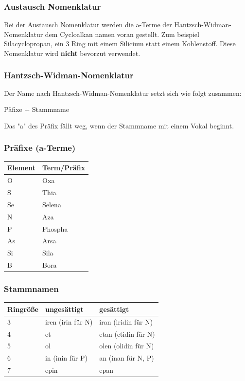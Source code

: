 \documentclass{article}
\begin{document}
\subsubsection{Austausch Nomenklatur}
Bei der Austausch Nomenklatur werden die a-Terme der Hantzsch-Widman-Nomenklatur dem Cycloalkan namen voran gestellt.
Zum beispiel Silacyclopropan, ein 3 Ring mit einem Silicium statt einem Kohlenstoff.
Diese Nomenklatur wird \textbf{nicht} bevorzut verwendet.

\subsubsection{Hantzsch-Widman-Nomenklatur}
Der Name nach Hantzsch-Widman-Nomenklatur setzt sich wie folgt zusammen:
\begin{center}
	Päfixe + Stammname
\end{center}
Das "a" des Präfix fällt weg, wenn der Stammname mit einem Vokal beginnt.
\subsubsection*{Präfixe (a-Terme)}
\begin{table}[H]
	\centering
	\begin{tabular}{|l|l|}
		\hline 
		\textbf{Element} & \textbf{Term/Präfix}\\
		\hline
		\hline
		O & Oxa\\
		S & Thia\\
		Se & Selena\\
		N & Aza\\
		P & Phospha\\
		As & Arsa \\
		Si & Sila\\
		B & Bora\\
		\hline
	\end{tabular}
\end{table}
\subsubsection*{Stammnamen}
\begin{table}[H]
	\centering 
	\begin{tabular}{|l|l|l|}
		\hline 
		\textbf{Ringröße} & \textbf{ungesättigt} & \textbf{gesättigt}\\
		\hline \hline
		3&iren (irin für N)&iran (iridin für N)\\
		4& et& etan (etidin für N)\\
		5& ol & olen (olidin für N)\\
		6& in (inin für P)&an (inan für N, P)\\
		7&epin&epan\\
		\hline
	\end{tabular}
\end{table}
\end{document}
